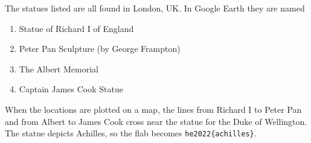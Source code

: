 The statues listed are all found in London, UK.  In Google Earth they are named
\begin{enumerate}
\item    Statue of Richard I of England
\item     Peter Pan Sculpture (by George Frampton)
\item     The Albert Memorial
\item     Captain James Cook Statue
\end{enumerate}

When the locations are plotted on a map, the lines from Richard I to Peter Pan
and from Albert to James Cook cross near the statue for the Duke of Wellington.
The statue depicts Achilles, so the flab becomes 
\verb+he2022{achilles}+.




